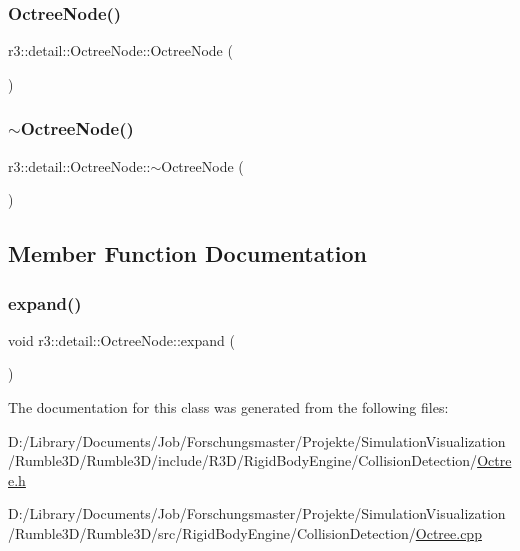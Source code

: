 \subsubsection{\texorpdfstring{Octree\+Node()}{OctreeNode()}}
{\footnotesize\ttfamily r3\+::detail\+::\+Octree\+Node\+::\+Octree\+Node (\begin{DoxyParamCaption}{ }\end{DoxyParamCaption})\hspace{0.3cm}{\ttfamily [explicit]}}

\mbox{\label{classr3_1_1detail_1_1_octree_node_aad03f7781769d54ec136cd29d1444046}} 
\subsubsection{\texorpdfstring{$\sim$\+Octree\+Node()}{~OctreeNode()}}
{\footnotesize\ttfamily r3\+::detail\+::\+Octree\+Node\+::$\sim$\+Octree\+Node (\begin{DoxyParamCaption}{ }\end{DoxyParamCaption})}



\subsection{Member Function Documentation}
\mbox{\label{classr3_1_1detail_1_1_octree_node_a7fed2d9ab9f17979add0276a4be6a2fe}} 
\subsubsection{\texorpdfstring{expand()}{expand()}}
{\footnotesize\ttfamily void r3\+::detail\+::\+Octree\+Node\+::expand (\begin{DoxyParamCaption}{ }\end{DoxyParamCaption})}



The documentation for this class was generated from the following files\+:\begin{DoxyCompactItemize}
\item 
D\+:/\+Library/\+Documents/\+Job/\+Forschungsmaster/\+Projekte/\+Simulation\+Visualization/\+Rumble3\+D/\+Rumble3\+D/include/\+R3\+D/\+Rigid\+Body\+Engine/\+Collision\+Detection/\mbox{\hyperlink{_octree_8h}{Octree.\+h}}\item 
D\+:/\+Library/\+Documents/\+Job/\+Forschungsmaster/\+Projekte/\+Simulation\+Visualization/\+Rumble3\+D/\+Rumble3\+D/src/\+Rigid\+Body\+Engine/\+Collision\+Detection/\mbox{\hyperlink{_octree_8cpp}{Octree.\+cpp}}\end{DoxyCompactItemize}
